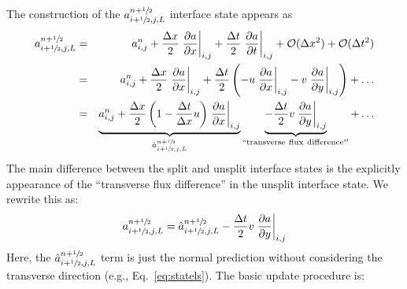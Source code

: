 The construction of the $a_{i+{\sfrac{1}{2}},j,L}^{n+{\sfrac{1}{2}}}$ interface state appears as
\begin{eqnarray}
a_{i+{\sfrac{1}{2}},j,L}^{n+{\sfrac{1}{2}}} &=& a_{i,j}^n + 
  \frac{\Delta x}{2} \left .\frac{\partial a}{\partial x} \right |_{i,j} + 
  \frac{\Delta t}{2} \left .\frac{\partial a}{\partial t} \right |_{i,j} + 
  \mathcal{O}(\Delta x^2) + \mathcal{O}(\Delta t^2) \nonumber \\
 &=& a_{i,j}^n + 
   \frac{\Delta x}{2} \left .\frac{\partial a}{\partial x} \right |_{i,j} + 
   \frac{\Delta t}{2} \left ( 
   - u \left .\frac{\partial a}{\partial x} \right |_{i,j} 
   - v \left .\frac{\partial a}{\partial y} \right |_{i,j} \right
   ) + \ldots \nonumber \\
    &=& \underbrace{a_{i,j}^n + 
   \frac{\Delta x}{2} \left ( 1 - \frac{\Delta t}{\Delta x} u \right ) 
   \left .\frac{\partial a}{\partial x} \right |_{i,j}}_{\hat{a}_{i+{\sfrac{1}{2}},j,L}^{n+{\sfrac{1}{2}}}} \underbrace{-
   \frac{\Delta t}{2} v \left .\frac{\partial a}{\partial y} \right |_{i,j}}_{\mathrm{``transverse~flux~difference''}} +
   \ldots \label{eq:statelu}
\end{eqnarray}
The main difference between the split and unsplit interface states is the
explicitly appearance of the ``transverse flux difference'' in the unsplit
interface state.  We rewrite this as:
\begin{equation}
a_{i+{\sfrac{1}{2}},j,L}^{n+{\sfrac{1}{2}}} = \hat{a}_{i+{\sfrac{1}{2}},j,L}^{n+{\sfrac{1}{2}}} 
   - \frac{\Delta t}{2} v \left .\frac{\partial a}{\partial y} \right |_{i,j}
\end{equation}
Here, the $\hat{a}_{i+{\sfrac{1}{2}},j,L}^{n+{\sfrac{1}{2}}}$ term is just the normal
prediction without considering the transverse direction (e.g., Eq.~\ref{eq:statels}).  The basic
update procedure is:
